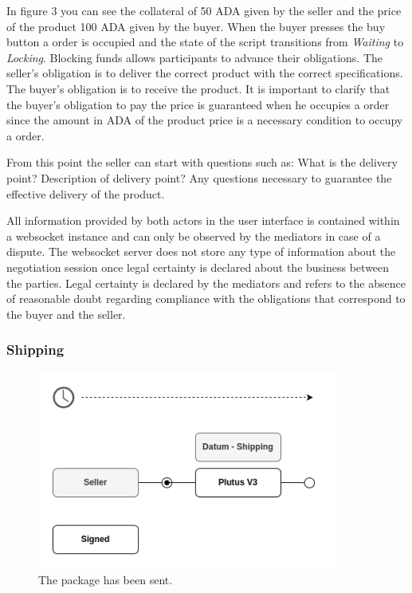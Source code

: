 \documentclass[12pt]{article}
\begin{document}
In figure 3 you can see the collateral of 50 ADA given by the seller and the price of the product 100 ADA given by the buyer.
When the buyer presses the buy button a order is occupied and the state of the script transitions from \emph{Waiting} to \emph{Locking}.
Blocking funds allows participants to advance their obligations.
The seller's obligation is to deliver the correct product with the correct specifications. The buyer's obligation is to receive the product.
It is important to clarify that the buyer's obligation to pay the price is guaranteed when he occupies a order since the amount in ADA of the product price is a necessary condition to occupy a order.

From this point the seller can start with questions such as: What is the delivery point? Description of delivery point? Any questions necessary to guarantee the effective delivery of the product.

All information provided by both actors in the user interface is contained within a websocket instance and can only be observed by the mediators in case of a dispute.
The websocket server does not store any type of information about the negotiation session once legal certainty is declared about the business between the parties.
Legal certainty is declared by the mediators and refers to the absence of reasonable doubt regarding compliance with the obligations that correspond to the buyer and the seller.


\subsubsection { Shipping }


\begin{figure}[ht]
  \centering
  \includegraphics[width=0.88\textwidth, keepaspectratio]{3.png}
  \caption{The package has been sent.}  
  \label{fig:delivered}
\end{figure}
\end{document}
